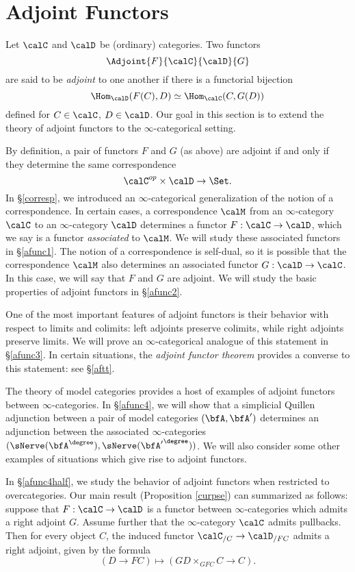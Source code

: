 \section{Adjoint Functors}\label{c5s2}

\setcounter{theorem}{0}

Let $\calC$ and $\calD$ be (ordinary) categories. Two functors
$$ \Adjoint{F}{ \calC }{\calD}{G}$$
are said to be {\it adjoint} to one another if there is a functorial bijection
$$ \Hom_{\calD}(F(C), D) \simeq \Hom_{\calC}( C, G(D))$$
defined for $C \in \calC$, $D \in \calD$. Our goal in this section is
to extend the theory of adjoint functors to the $\infty$-categorical setting.

By definition, a pair of functors $F$ and $G$ (as above) are adjoint if and only if they
determine the same correspondence $$ \calC^{op} \times \calD \rightarrow \Set.$$ 
In \S \ref{corresp}, we introduced an $\infty$-categorical generalization of the notion of a correspondence. In certain cases, a correspondence $\calM$ from an $\infty$-category
$\calC$ to an $\infty$-category $\calD$ determines a functor $F: \calC \rightarrow \calD$, which we say is a functor {\it associated} to $\calM$. We will study these associated functors in \S \ref{afunc1}. The notion of a correspondence is self-dual, so it is possible that the correspondence $\calM$ also determines an associated functor $G: \calD \rightarrow \calC$. In this case, we will say that
$F$ and $G$ are adjoint. We will study the basic properties of adjoint functors in \S \ref{afunc2}.

One of the most important features of adjoint functors is their behavior with respect to limits and colimits: left adjoints preserve colimits, while right adjoints preserve limits. We will prove an $\infty$-categorical analogue of this statement in \S \ref{afunc3}. In certain situations, the {\it adjoint functor theorem} provides a converse to this statement: see \S \ref{aftt}.

The theory of model categories provides a host of examples of adjoint functors between $\infty$-categories. In \S \ref{afunc4}, we will show that a simplicial Quillen adjunction
between a pair of model categories $(\bfA,\bfA')$ determines an adjunction between the associated $\infty$-categories $(\sNerve(\bfA^{\degree}), \sNerve({\bfA'}^{\degree}))$. We will also consider some other examples of situations which give rise to adjoint functors.

In \S \ref{afunc4half}, we study the behavior of adjoint functors when restricted to overcategories.
Our main result (Proposition \ref{curpse}) can summarized as follows: suppose that
$F: \calC \rightarrow \calD$ is a functor between $\infty$-categories which admits a right adjoint
$G$. Assume further that the $\infty$-category $\calC$ admits pullbacks. Then for every object
$C$, the induced functor $\calC_{/C} \rightarrow \calD_{/FC}$ admits a right adjoint, given by
the formula 
$$(D \rightarrow FC) \mapsto (GD \times_{GFC} C \rightarrow C).$$

